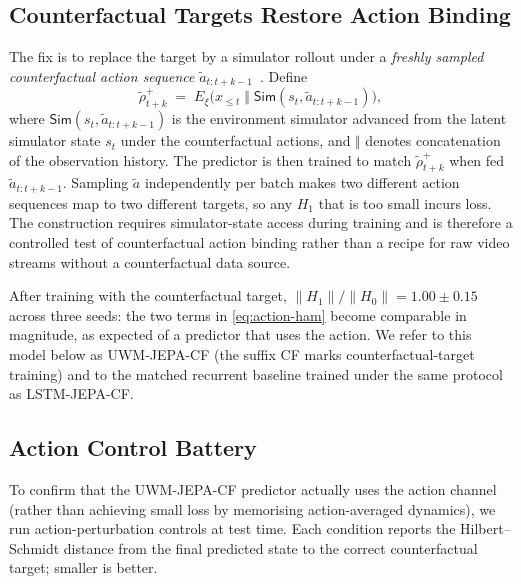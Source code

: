 \subsection{Counterfactual Targets Restore Action Binding}
\label{sec:counterfactual}

The fix is to replace the target by a simulator rollout under a
\emph{freshly sampled counterfactual action sequence}
$\tilde a_{t:t+k-1}$~\cite{buesing2018woulda}. Define
\begin{equation}
\tilde\rho_{t+k}^+ \;=\; E_\xi\bigl(x_{\le t} \;\Vert\;
\mathsf{Sim}(s_t, \tilde a_{t:t+k-1})\bigr),
\label{eq:cf-target}
\end{equation}
where $\mathsf{Sim}(s_t, \tilde a_{t:t+k-1})$ is the environment
simulator advanced from the latent simulator state $s_t$ under the
counterfactual actions, and $\Vert$ denotes concatenation of the
observation history. The predictor is then trained to match
$\tilde\rho_{t+k}^+$ when fed $\tilde a_{t:t+k-1}$. Sampling $\tilde a$
independently per batch makes two different action sequences map to
two different targets, so any $H_1$ that is too small incurs loss. The
construction requires simulator-state access during training and is
therefore a controlled test of counterfactual action binding rather
than a recipe for raw video streams without a counterfactual data
source.

After training with the counterfactual target,
$\|H_1\| / \|H_0\| = 1.00 \pm 0.15$ across three seeds: the two terms
in \cref{eq:action-ham} become comparable in magnitude, as expected of
a predictor that uses the action. We refer to this model below as
UWM-JEPA-CF (the suffix CF marks counterfactual-target training) and
to the matched recurrent baseline trained under the same protocol as
LSTM-JEPA-CF.

\subsection{Action Control Battery}
\label{sec:action-controls}

To confirm that the UWM-JEPA-CF predictor actually uses the action channel
(rather than achieving small loss by memorising action-averaged
dynamics), we run action-perturbation controls at test time. Each
condition reports the Hilbert--Schmidt distance from the final
predicted state to the correct counterfactual target; smaller is
better.

